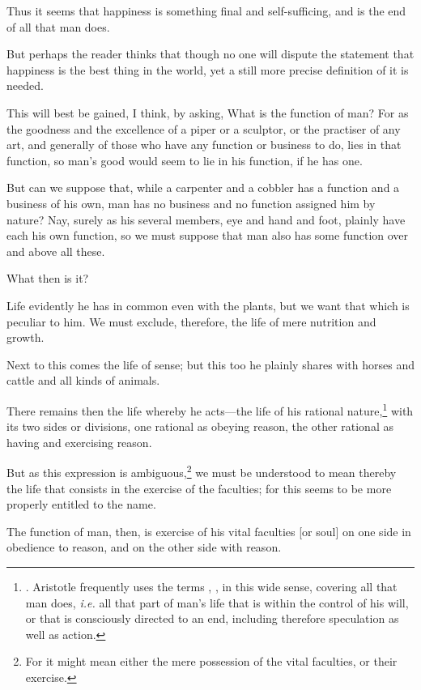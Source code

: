 Thus it seems that happiness is something final and self-sufficing,
and is the end of all that man does.

But perhaps the reader thinks that though no one will dispute the
statement that happiness is the best thing in the world, yet a still
more precise definition of it is needed.

This will best be gained, I think, by asking, What is the function of
man? For as the goodness and the excellence of a piper or a sculptor,
or the practiser of any art, and generally of those who have any
function or business to do, lies in that function, so man's good would
seem to lie in his function, if he has one.

But can we suppose that, while a carpenter and a cobbler has a
function and a business of his own, man has no business and no
function assigned him by nature? Nay, surely as his several members,
eye and hand and foot, plainly have each his own function, so we must
suppose that man also has some function over and above all these.

What then is it?

Life evidently he has in common even with the plants, but we want that
which is peculiar to him. We must exclude, therefore, the life of mere
nutrition and growth.

Next to this comes the life of sense; but this too he plainly shares
with horses and cattle and all kinds of animals.

There remains then the life whereby he acts---the  life of
his rational nature,\footnote{.
Aristotle frequently uses the terms , ,
 in this wide sense, covering all that man does,
\textit{i.e.} all that part of man's life that is within the control
of his will, or that is consciously directed to an end, including
therefore speculation as well as action.} with its two sides or
divisions, one rational as obeying reason, the other rational as
having and exercising reason.

But as this expression is ambiguous,\footnote{For it might mean either
the mere possession of the vital faculties, or their exercise.} we
must be understood to mean thereby the life that consists in the
exercise of the faculties; for this seems to be more properly entitled
to the name.

The function of man, then, is exercise of his vital faculties [or
soul] on one side in obedience to reason, and on the other side with
reason.


